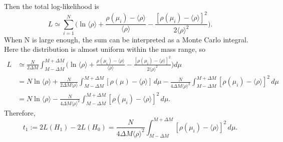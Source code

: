 \documentclass[11pt]{article}
\theoremstyle{definition}
\theoremstyle{remark}
\begin{document}
	Then the total log-likelihood is
	\[L\simeq\sum_{i=1}^{N}\bigg(\ln\langle\rho\rangle+\frac{\rho(\mu_{i})-\langle\rho\rangle}{\langle\rho\rangle}-\frac{[\rho(\mu_{i})-\langle\rho\rangle]^{2}}{2\langle\rho\rangle^{2}}\bigg).\]
	When N is large enough, the sum can be interpreted as a Monte Carlo integral.
	Here the distribution is almost uniform within the mass range, so
	\begin{align*}
		L&\simeq\frac{N}{2\Delta M}\int_{M-\Delta M}^{M+\Delta M}\bigg(\ln\langle\rho\rangle+\frac{\rho(\mu_{i})-\langle\rho\rangle}{\langle\rho\rangle}-\frac{[\rho(\mu_{i})-\langle\rho\rangle]^{2}}{2\langle\rho\rangle^{2}}\bigg)d\mu\\
		&=N\ln\langle\rho\rangle+\frac{N}{2\Delta M\langle\rho\rangle}\int_{M-\Delta M}^{M+\Delta M}[\rho(\mu)-\langle\rho\rangle]\,d\mu-\frac{N}{4\Delta M\langle\rho\rangle^{2}}\int_{M-\Delta M}^{M+\Delta M}[\rho(\mu_{i})-\langle\rho\rangle]^{2}\,d\mu\\
		&=N\ln\langle\rho\rangle-\frac{N}{4\Delta M\langle\rho\rangle^{2}}\int_{M-\Delta M}^{M+\Delta M}[\rho(\mu_{i})-\langle\rho\rangle]^{2}\,d\mu.
	\end{align*}
	Therefore,
	\[t_{1}:=2L(H_{1})-2L(H_{0})=\frac{N}{4\Delta M\langle\rho\rangle^{2}}\int_{M-\Delta M}^{M+\Delta M}[\rho(\mu_{i})-\langle\rho\rangle]^{2}\,d\mu.\]
	
\end{document}
